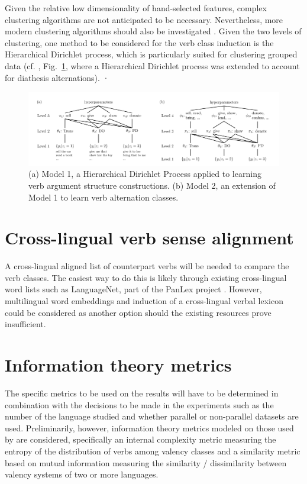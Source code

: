 Given the relative low dimensionality of hand-selected features, complex clustering algorithms are not anticipated to be necessary. Nevertheless, more modern clustering algorithms should also be investigated \citep{xu2015a}. Given the two levels of clustering, one method to be considered for the verb class induction is the Hierarchical Dirichlet process, which is particularly suited for clustering grouped data (cf. \citet{parisien2010}, Fig.~\ref{fig:parisien2010}, where a Hierarchical Dirichlet process was extended to account for diathesis alternations).
·
\begin{figure}
    \includegraphics[width=\textwidth]{figures/verb_alternation_classes.png}
    \centering
    \caption{(a) Model 1, a Hierarchical Dirichlet Process applied to learning verb argument structure constructions. (b) Model 2,
    an extension of Model 1 to learn verb alternation classes.}\label{fig:parisien2010}
\end{figure}

\section{Cross-lingual verb sense alignment}

A cross-lingual aligned list of counterpart verbs will be needed to compare the verb classes. The easiest way to do this is likely through existing cross-lingual word lists such as LanguageNet, part of the PanLex project \citep{kamholz2014}. However, multilingual word embeddings and induction of a cross-lingual verbal lexicon could be considered as another option should the existing resources prove insufficient.

\section{Information theory metrics}

The specific metrics to be used on the results will have to be determined in combination with the decisions to be made in the experiments such as the number of the language studied and whether parallel or non-parallel datasets are used. Preliminarily, however, information theory metrics modeled on those used by \citet{say2014} are considered, specifically an internal complexity metric measuring the entropy of the distribution of verbs among valency classes and a similarity metric based on mutual information measuring the similarity / dissimilarity between valency systems of two or more languages.